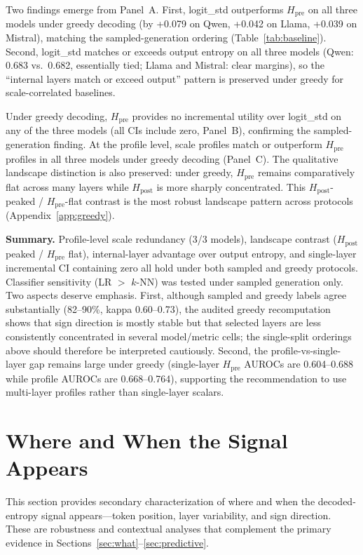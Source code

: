 \documentclass{ieeeaccess}
\newcommand{\Hpre}{H_{\text{pre}}}
\newcommand{\Hpost}{H_{\text{post}}}
\begin{document}
Two findings emerge from Panel~A. First, logit\_std outperforms $\Hpre$ on all three models under greedy decoding (by +0.079 on Qwen, +0.042 on Llama, +0.039 on Mistral), matching the sampled-generation ordering (Table~\ref{tab:baseline}). Second, logit\_std matches or exceeds output entropy on all three models (Qwen: 0.683 vs.\ 0.682, essentially tied; Llama and Mistral: clear margins), so the ``internal layers match or exceed output'' pattern is preserved under greedy for scale-correlated baselines.

Under greedy decoding, $\Hpre$ provides no incremental utility over logit\_std on any of the three models (all CIs include zero, Panel~B), confirming the sampled-generation finding. At the profile level, scale profiles match or outperform $\Hpre$ profiles in all three models under greedy decoding (Panel~C). The qualitative landscape distinction is also preserved: under greedy, $\Hpre$ remains comparatively flat across many layers while $\Hpost$ is more sharply concentrated. This $\Hpost$-peaked / $\Hpre$-flat contrast is the most robust landscape pattern across protocols (Appendix~\ref{app:greedy}).

\textbf{Summary.} Profile-level scale redundancy (3/3 models), landscape contrast ($\Hpost$ peaked / $\Hpre$ flat), internal-layer advantage over output entropy, and single-layer incremental CI containing zero all hold under both sampled and greedy protocols. Classifier sensitivity (LR $>$ $k$-NN) was tested under sampled generation only. Two aspects deserve emphasis. First, although sampled and greedy labels agree substantially (82--90\%, kappa 0.60--0.73), the audited greedy recomputation shows that sign direction is mostly stable but that selected layers are less consistently concentrated in several model/metric cells; the single-split orderings above should therefore be interpreted cautiously. Second, the profile-vs-single-layer gap remains large under greedy (single-layer $\Hpre$ AUROCs are 0.604--0.688 while profile AUROCs are 0.668--0.764), supporting the recommendation to use multi-layer profiles rather than single-layer scalars.


\FloatBarrier
\section{Where and When the Signal Appears}
\label{sec:where}

This section provides secondary characterization of where and when the decoded-entropy signal appears---token position, layer variability, and sign direction. These are robustness and contextual analyses that complement the primary evidence in Sections~\ref{sec:what}--\ref{sec:predictive}.
\end{document}

